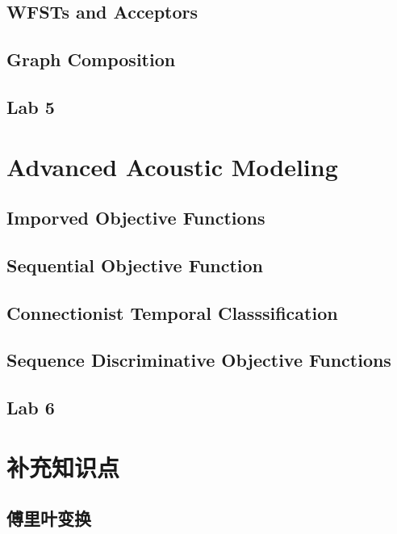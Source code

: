 \subsection{WFSTs and Acceptors}

\subsection{Graph Composition}

\subsection{Lab 5}


\section{Advanced Acoustic Modeling}
\subsection{Imporved Objective Functions}

\subsection{Sequential Objective Function}

\subsection{Connectionist Temporal Classsification}

\subsection{Sequence Discriminative Objective Functions}

\subsection{Lab 6}


\section{补充知识点}

\subsection{傅里叶变换}

